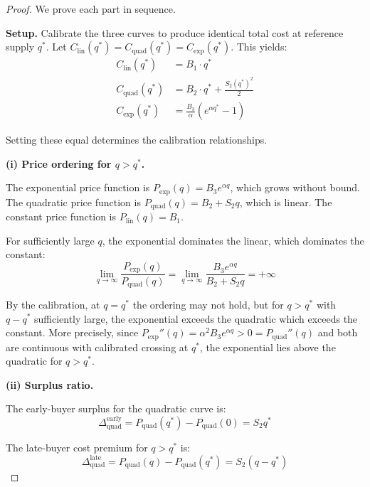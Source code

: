 \begin{proof}
We prove each part in sequence.

\textbf{Setup.} Calibrate the three curves to produce identical total cost at
reference supply $q^*$. Let $C_{\text{lin}}(q^*) = C_{\text{quad}}(q^*) =
C_{\text{exp}}(q^*)$. This yields:
\begin{align}
  C_{\text{lin}}(q^*) &= B_1 \cdot q^* \\
  C_{\text{quad}}(q^*) &= B_2 \cdot q^* + \frac{S_2 (q^*)^2}{2} \\
  C_{\text{exp}}(q^*) &= \frac{B_3}{\alpha}(e^{\alpha q^*} - 1)
\end{align}

Setting these equal determines the calibration relationships.

\textbf{(i) Price ordering for $q > q^*$.}

The exponential price function is $P_{\text{exp}}(q) = B_3 e^{\alpha q}$,
which grows without bound. The quadratic price function is $P_{\text{quad}}(q)
= B_2 + S_2 q$, which is linear. The constant price function is
$P_{\text{lin}}(q) = B_1$.

For sufficiently large $q$, the exponential dominates the linear, which
dominates the constant:
\begin{equation}
  \lim_{q \to \infty} \frac{P_{\text{exp}}(q)}{P_{\text{quad}}(q)} = \lim_{q \to \infty} \frac{B_3 e^{\alpha q}}{B_2 + S_2 q} = +\infty
\end{equation}

By the calibration, at $q = q^*$ the ordering may not hold, but for $q > q^*$
with $q - q^*$ sufficiently large, the exponential exceeds the quadratic which
exceeds the constant. More precisely, since $P_{\text{exp}}''(q) = \alpha^2 B_3
e^{\alpha q} > 0 = P_{\text{quad}}''(q)$ and both are continuous with
calibrated crossing at $q^*$, the exponential lies above the quadratic for
$q > q^*$.

\textbf{(ii) Surplus ratio.}

The early-buyer surplus for the quadratic curve is:
\begin{equation}
  \Delta_{\text{quad}}^{\text{early}} = P_{\text{quad}}(q^*) - P_{\text{quad}}(0) = S_2 q^*
\end{equation}

The late-buyer cost premium for $q > q^*$ is:
\begin{equation}
  \Delta_{\text{quad}}^{\text{late}} = P_{\text{quad}}(q) - P_{\text{quad}}(q^*) = S_2 (q - q^*)
\end{equation}


\end{proof}
